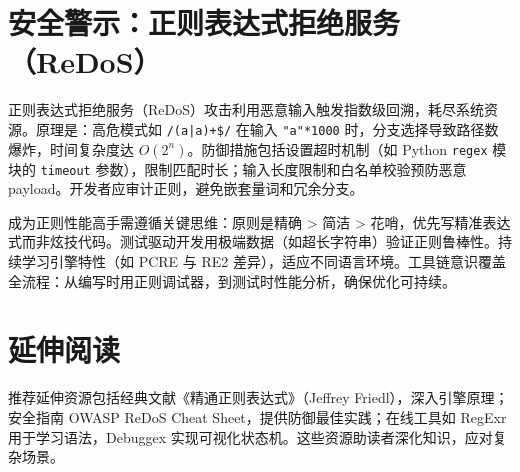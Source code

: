 \chapter{安全警示：正则表达式拒绝服务（ReDoS）}
正则表达式拒绝服务（ReDoS）攻击利用恶意输入触发指数级回溯，耗尽系统资源。原理是：高危模式如 \texttt{/(a|a)+\${}/} 在输入 \texttt{"a"*1000} 时，分支选择导致路径数爆炸，时间复杂度达 $O(2^n)$。防御措施包括设置超时机制（如 Python \texttt{regex} 模块的 \texttt{timeout} 参数），限制匹配时长；输入长度限制和白名单校验预防恶意 payload。开发者应审计正则，避免嵌套量词和冗余分支。\par
成为正则性能高手需遵循关键思维：原则是精确 > 简洁 > 花哨，优先写精准表达式而非炫技代码。测试驱动开发用极端数据（如超长字符串）验证正则鲁棒性。持续学习引擎特性（如 PCRE 与 RE2 差异），适应不同语言环境。工具链意识覆盖全流程：从编写时用正则调试器，到测试时性能分析，确保优化可持续。\par
\chapter{延伸阅读}
推荐延伸资源包括经典文献《精通正则表达式》（Jeffrey Friedl），深入引擎原理；安全指南 OWASP ReDoS Cheat Sheet，提供防御最佳实践；在线工具如 RegExr 用于学习语法，Debuggex 实现可视化状态机。这些资源助读者深化知识，应对复杂场景。\par
